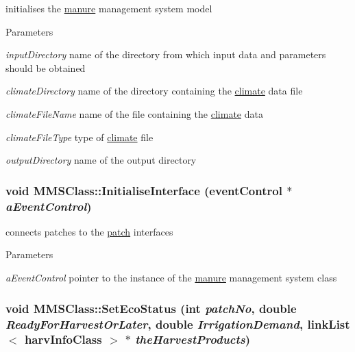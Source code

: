 initialises the \hyperlink{classmanure}{manure} management system model 
\begin{DoxyParams}{Parameters}
\item[{\em inputDirectory}]name of the directory from which input data and parameters should be obtained \item[{\em climateDirectory}]name of the directory containing the \hyperlink{classclimate}{climate} data file \item[{\em climateFileName}]name of the file containing the \hyperlink{classclimate}{climate} data \item[{\em climateFileType}]type of \hyperlink{classclimate}{climate} file \item[{\em outputDirectory}]name of the output directory \end{DoxyParams}
\hypertarget{class_m_m_s_class_acdbfef61f2562067975629532d0da4bf}{
\subsubsection[{InitialiseInterface}]{\setlength{\rightskip}{0pt plus 5cm}void MMSClass::InitialiseInterface ({\bf eventControl} $\ast$ {\em aEventControl})}}
\label{class_m_m_s_class_acdbfef61f2562067975629532d0da4bf}


connects patches to the \hyperlink{classpatch}{patch} interfaces 
\begin{DoxyParams}{Parameters}
\item[{\em aEventControl}]pointer to the instance of the \hyperlink{classmanure}{manure} management system class \end{DoxyParams}
\hypertarget{class_m_m_s_class_a618f8d059a46ed238e0ef8d58207722e}{
\subsubsection[{SetEcoStatus}]{\setlength{\rightskip}{0pt plus 5cm}void MMSClass::SetEcoStatus (int {\em patchNo}, \/  double {\em ReadyForHarvestOrLater}, \/  double {\em IrrigationDemand}, \/  {\bf linkList}$<$ {\bf harvInfoClass} $>$ $\ast$ {\em theHarvestProducts})}}
\label{class_m_m_s_class_a618f8d059a46ed238e0ef8d58207722e}


